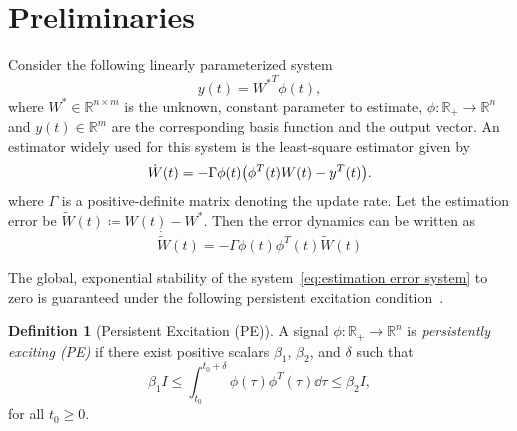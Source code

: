 \documentclass[]{IEEEtran}
\theoremstyle{definition}
\newtheorem{definition}{Definition}
\theoremstyle{remark}
\newcommand{\MB}[1]{\mathbb{#1}}
\begin{document}
\section{Preliminaries}

Consider the following linearly parameterized system
\begin{equation*}
	y(t) = {W^\ast}^T \phi(t),
\end{equation*}
where $W^\ast \in \MB{R}^{n \times m}$ is the unknown, constant parameter to
estimate, $\phi: \MB{R}_{+} \to \MB{R}^n$ and $y(t) \in \MB{R}^m$ are the
corresponding basis function and the output vector. An estimator widely used
for this system is the least-square estimator given by
\begin{equation}\label{eq:estimation system}
	\dot{W}(t) =  - \Gamma \phi(t) \qty(\phi^T(t) W(t) - y^T(t)).
\end{equation}
where $\Gamma$ is a positive-definite matrix denoting the update rate. Let the
estimation error be $\tilde{W}(t) \coloneqq W(t) - W^\ast$. Then the error
dynamics can be written as
\begin{equation}\label{eq:estimation error system}
	\dot{\tilde{W}} (t) = - \Gamma \phi(t) \phi^T(t) \tilde{W}(t)
\end{equation}

The global, exponential stability of the
system~\eqref{eq:estimation error system} to zero is guaranteed under the
following persistent excitation condition~\cite{anderson_exponential_1977,
slotine_applied_1991}.

\begin{definition}[Persistent Excitation (PE)]
	A signal $\phi: \MB{R}_{+} \to \MB{R}^n$ is \textit{persistently exciting
	(PE)} if there exist positive scalars $\beta_1$, $\beta_2$, and $\delta$ such
	that
	\begin{equation}\label{eq:PE}
		\beta_1 I \le \int_{t_0}^{t_0+\delta} \phi(\tau) \phi^T(\tau) \dd{\tau} \le
		\beta_2 I,
	\end{equation}
	for all $t_0 \ge 0$.
\end{definition}



\end{document}
